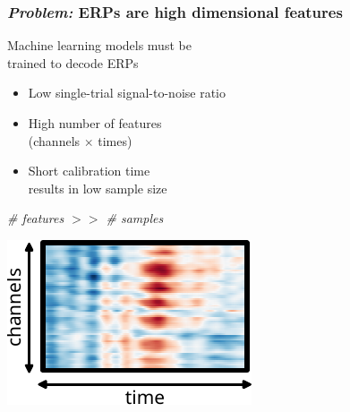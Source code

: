 \documentclass{kul-ulille-beamer}
\begin{document}
\begin{frame}[c]
  \frametitle{\emph{Problem:} ERPs are high dimensional features}
  \begin{minipage}[c]{.5\textwidth}
    Machine learning models must be \\ trained to decode ERPs
    \begin{itemize}
      \item Low single-trial signal-to-noise ratio
      \item High number of features \\ (channels $\times$ times)
      \item Short calibration time \\ results in low sample size
    \end{itemize}
    \bigskip

    \centering
    \emph{\# features $>>$ \# samples}

  \end{minipage}\hfill%
  \begin{minipage}[c]{.4\textwidth}
    \raggedleft

    \includegraphics[width=\textwidth]{figures/bttda/tensor_st.pdf}

  \end{minipage}
\end{frame}
\end{document}
